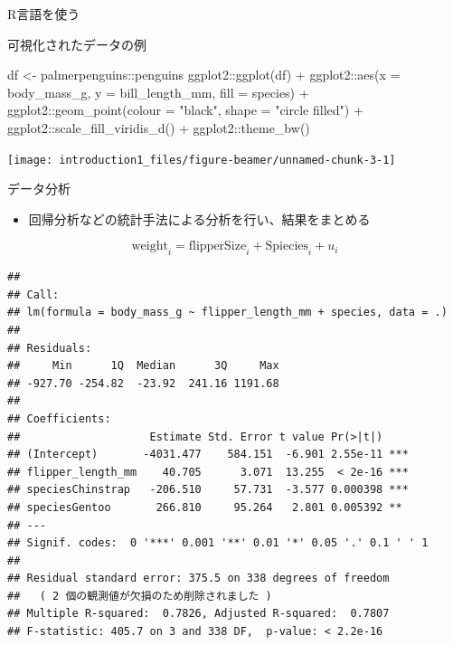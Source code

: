 \documentclass[
  ignorenonframetext,
]{beamer}
\newenvironment{Shaded}{\begin{snugshade}}{\end{snugshade}}
\newcommand{\AttributeTok}[1]{\textcolor[rgb]{0.77,0.63,0.00}{#1}}
\newcommand{\FunctionTok}[1]{\textcolor[rgb]{0.00,0.00,0.00}{#1}}
\newcommand{\NormalTok}[1]{#1}
\newcommand{\OtherTok}[1]{\textcolor[rgb]{0.56,0.35,0.01}{#1}}
\newcommand{\SpecialCharTok}[1]{\textcolor[rgb]{0.00,0.00,0.00}{#1}}
\newcommand{\StringTok}[1]{\textcolor[rgb]{0.31,0.60,0.02}{#1}}
\providecommand{\tightlist}{%
  \setlength{\itemsep}{0pt}\setlength{\parskip}{0pt}}
\begin{document}
\begin{frame}[fragile]{R言語を使う}
\begin{block}{可視化されたデータの例}
\protect\hypertarget{ux53efux8996ux5316ux3055ux308cux305fux30c7ux30fcux30bfux306eux4f8b}{}
\begin{Shaded}
\begin{Highlighting}[]
\NormalTok{df }\OtherTok{\textless{}{-}}\NormalTok{ palmerpenguins}\SpecialCharTok{::}\NormalTok{penguins}
\NormalTok{ggplot2}\SpecialCharTok{::}\FunctionTok{ggplot}\NormalTok{(df) }\SpecialCharTok{+}
\NormalTok{  ggplot2}\SpecialCharTok{::}\FunctionTok{aes}\NormalTok{(}\AttributeTok{x =}\NormalTok{ body\_mass\_g, }\AttributeTok{y =}\NormalTok{ bill\_length\_mm, }\AttributeTok{fill =}\NormalTok{ species) }\SpecialCharTok{+}
\NormalTok{  ggplot2}\SpecialCharTok{::}\FunctionTok{geom\_point}\NormalTok{(}\AttributeTok{colour =} \StringTok{"black"}\NormalTok{, }\AttributeTok{shape =} \StringTok{"circle filled"}\NormalTok{) }\SpecialCharTok{+}
\NormalTok{  ggplot2}\SpecialCharTok{::}\FunctionTok{scale\_fill\_viridis\_d}\NormalTok{() }\SpecialCharTok{+}
\NormalTok{  ggplot2}\SpecialCharTok{::}\FunctionTok{theme\_bw}\NormalTok{()}
\end{Highlighting}
\end{Shaded}

\begin{center}\texttt{[image: introduction1\_files/figure-beamer/unnamed-chunk-3-1]} \end{center}
\end{block}

\begin{block}{データ分析}
\protect\hypertarget{ux30c7ux30fcux30bfux5206ux6790}{}
\begin{itemize}
\tightlist
\item
  回帰分析などの統計手法による分析を行い、結果をまとめる
\end{itemize}

\[\text{weight}_{i} = \text{flipperSize}_i + \text{Spiecies}_i + u_i\]

\begin{verbatim}
## 
## Call:
## lm(formula = body_mass_g ~ flipper_length_mm + species, data = .)
## 
## Residuals:
##     Min      1Q  Median      3Q     Max 
## -927.70 -254.82  -23.92  241.16 1191.68 
## 
## Coefficients:
##                    Estimate Std. Error t value Pr(>|t|)    
## (Intercept)       -4031.477    584.151  -6.901 2.55e-11 ***
## flipper_length_mm    40.705      3.071  13.255  < 2e-16 ***
## speciesChinstrap   -206.510     57.731  -3.577 0.000398 ***
## speciesGentoo       266.810     95.264   2.801 0.005392 ** 
## ---
## Signif. codes:  0 '***' 0.001 '**' 0.01 '*' 0.05 '.' 0.1 ' ' 1
## 
## Residual standard error: 375.5 on 338 degrees of freedom
##   ( 2 個の観測値が欠損のため削除されました )
## Multiple R-squared:  0.7826, Adjusted R-squared:  0.7807 
## F-statistic: 405.7 on 3 and 338 DF,  p-value: < 2.2e-16
\end{verbatim}
\end{block}


\end{frame}
\end{document}
